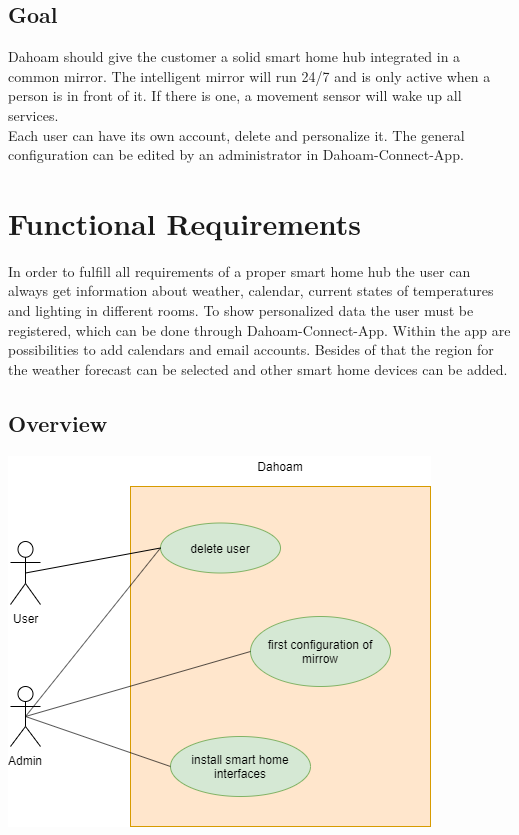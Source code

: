 \documentclass[12pt]{article}
\theoremstyle{definition}
\begin{document}
\pagebreak
\subsection{Goal}
Dahoam should give the customer a solid smart home hub integrated in a common mirror. The intelligent mirror will run 24/7 and is only active when a person is in front of it. If there is one, a movement sensor will wake up all services. \\
Each user can have its own account, delete and personalize it. The general configuration can be edited by an administrator in Dahoam-Connect-App.

\pagebreak

\section{Functional Requirements}
In order to fulfill all requirements of a proper smart home hub the user can always get information about weather, calendar, current states of temperatures and lighting in different rooms. To show personalized data the user must be registered, which can be done through Dahoam-Connect-App. Within the app are possibilities to add calendars and email accounts. Besides of that the region for the weather forecast can be selected and other smart home devices can be added.


\subsection{Overview}
\begin{center}
\includegraphics[scale=.7]{UseCase/UseCase.png}\\
\end{center}
\end{document}
